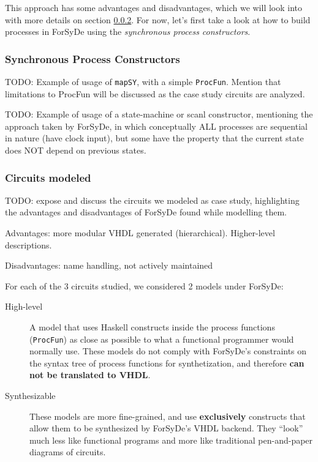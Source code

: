 \documentclass[a4paper]{article}
\begin{document}
                This approach has some advantages and disadvantages, which we will look into with
                more details on section \ref{subsubsec:forsyde-circuits}. For now, let's first take
                a look at how to build processes in ForSyDe using the \emph{synchronous process
                    constructors}.

            \subsubsection{Synchronous Process Constructors}
            \label{subsubsec:forsyde-synchprocs}
                TODO: Example of usage of \texttt{mapSY}, with a simple \texttt{ProcFun}. Mention
                that limitations to ProcFun will be discussed as the case study circuits are
                analyzed.

                TODO: Example of usage of a state-machine or scanl constructor, mentioning the
                approach taken by ForSyDe, in which conceptually ALL processes are sequential in
                nature (have clock input), but some have the property that the current state does
                NOT depend on previous states.


            \subsubsection{Circuits modeled}
            \label{subsubsec:forsyde-circuits}
                TODO: expose and discuss the circuits we modeled as case study, highlighting the
                advantages and disadvantages of ForSyDe found while modelling them.

                Advantages: more modular VHDL generated (hierarchical). Higher-level descriptions.

                Disadvantages: name handling, not actively maintained

                For each of the 3 circuits studied, we considered 2 models under ForSyDe:
                \begin{description}
                    \item[High-level] A model that uses Haskell constructs inside the process
                        functions (\texttt{ProcFun}) as close as possible to what
                        a functional programmer would normally use. These models do not comply with
                        ForSyDe's constraints on the syntax tree of process functions for
                        synthetization, and therefore \textbf{can not be translated to VHDL}.

                    \item[Synthesizable] These models are more fine-grained, and use
                        \textbf{exclusively} constructs that allow them to be synthesized by
                        ForSyDe's VHDL backend. They ``look'' much less like functional programs and
                        more like traditional pen-and-paper diagrams of circuits.
                \end{description}
\end{document}
